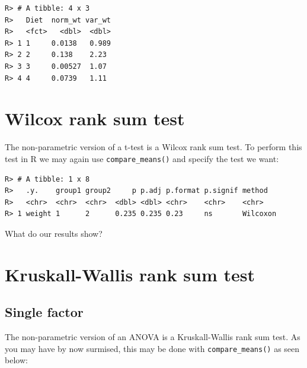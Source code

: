 \documentclass[english,10pt,a4paper,oneside]{book}
\newenvironment{Shaded}{\begin{snugshade}}{\end{snugshade}}
\newcommand{\DataTypeTok}[1]{\textcolor[rgb]{0.13,0.29,0.53}{#1}}
\newcommand{\DecValTok}[1]{\textcolor[rgb]{0.00,0.00,0.81}{#1}}
\newcommand{\KeywordTok}[1]{\textcolor[rgb]{0.13,0.29,0.53}{\textbf{#1}}}
\newcommand{\NormalTok}[1]{#1}
\newcommand{\OperatorTok}[1]{\textcolor[rgb]{0.81,0.36,0.00}{\textbf{#1}}}
\newcommand{\StringTok}[1]{\textcolor[rgb]{0.31,0.60,0.02}{#1}}
\theoremstyle{definition}
\theoremstyle{definition}
\theoremstyle{definition}
\theoremstyle{remark}
\begin{document}
\begin{verbatim}
R> # A tibble: 4 x 3
R>   Diet  norm_wt var_wt
R>   <fct>   <dbl>  <dbl>
R> 1 1     0.0138   0.989
R> 2 2     0.138    2.23 
R> 3 3     0.00527  1.07 
R> 4 4     0.0739   1.11
\end{verbatim}

\hypertarget{wilcox-rank-sum-test-1}{%
\section{Wilcox rank sum test}\label{wilcox-rank-sum-test-1}}

The non-parametric version of a t-test is a Wilcox rank sum test. To
perform this test in R we may again use \texttt{compare\_means()} and
specify the test we want:

\begin{Shaded}
\end{Shaded}

\begin{verbatim}
R> # A tibble: 1 x 8
R>   .y.    group1 group2     p p.adj p.format p.signif method  
R>   <chr>  <chr>  <chr>  <dbl> <dbl> <chr>    <chr>    <chr>   
R> 1 weight 1      2      0.235 0.235 0.23     ns       Wilcoxon
\end{verbatim}

What do our results show?

\hypertarget{kruskall-wallis-rank-sum-test-1}{%
\section{Kruskall-Wallis rank sum
test}\label{kruskall-wallis-rank-sum-test-1}}

\hypertarget{single-factor-2}{%
\subsection{Single factor}\label{single-factor-2}}

The non-parametric version of an ANOVA is a Kruskall-Wallis rank sum
test. As you may have by now surmised, this may be done with
\texttt{compare\_means()} as seen below:
\end{document}
